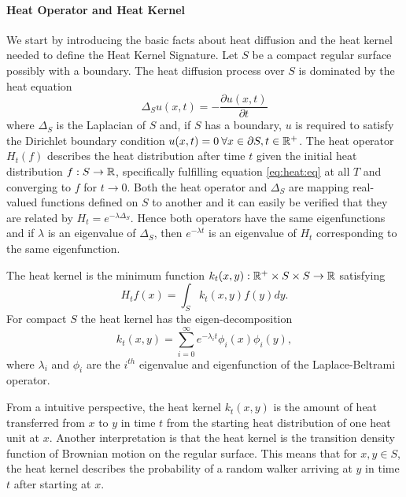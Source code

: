 \paragraph{Heat Operator and Heat Kernel}
We start by introducing the basic facts about heat diffusion and the heat kernel needed to define the Heat Kernel Signature.
Let $S$ be a compact regular surface possibly with a boundary.
The heat diffusion process over $S$ is dominated by the heat equation
\begin{equation*}
	\Delta_S u(x,t) = -\frac{\partial u(x,t)}{\partial t}
	\label{eq:heat:eq}
\end{equation*}
where $\Delta_S$ is the Laplacian of $S$ and, if $S$ has a boundary, $u$ is required to satisfy the Dirichlet boundary condition $u(x,t) = 0 \: \forall x\in \partial S,t\in \mathbb{R}^+$.
The heat operator $H_t(f)$ describes the heat distribution after time $t$ given the initial heat distribution $f: S \rightarrow \mathbb{R}$, specifically fulfilling equation \eqref{eq:heat:eq} at all $T$ and converging to $f$ for $t \rightarrow 0$.
Both the heat operator and $\Delta_S$ are mapping real-valued functions defined on $S$ to another and it can easily be verified that they are related by $H_t = e^{-\lambda \Delta_S}$.
Hence both operators have the same eigenfunctions and if $\lambda$ is an eigenvalue of $\Delta_S$, then $e^{-\lambda t}$ is an eigenvalue of $H_t$ corresponding to the same eigenfunction.
\begin{mydef}
	The heat kernel is the minimum function $k_t(x,y):\mathbb{R}^+ \times S \times S \rightarrow \mathbb{R}$ satisfying
	\begin{equation}
		H_tf(x) = \int_S k_t(x,y)f(y)dy.
		\label{eq:heat:kernel}
	\end{equation}
	For compact $S$ the heat kernel has the eigen-decomposition
	\begin{equation}
		k_t(x,y) = \sum_{i=0}^{\infty} e^{-\lambda_i t}\phi_i(x)\phi_i(y),
		\label{eq:heat:kernel:decomp}
	\end{equation}
	where $\lambda_i$ and $\phi_i$ are the $i^{th}$ eigenvalue and eigenfunction of the Laplace-Beltrami operator.
\end{mydef}
From a intuitive perspective, the heat kernel $k_t(x,y)$ is the amount of heat transferred from $x$ to $y$ in time $t$ from the starting heat distribution of one heat unit at $x$.
Another interpretation is that the heat kernel is the transition density function of Brownian motion on the regular surface.
This means that for $x,y\in S$, the heat kernel describes the probability of a random walker arriving at $y$ in time $t$ after starting at $x$.


